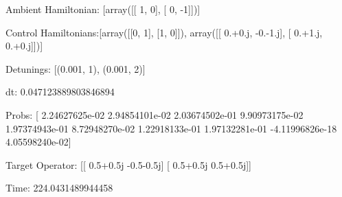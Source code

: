 \documentclass{article}
\begin{document}
    

\newpage

Ambient Hamiltonian: [array([[ 1,  0],
       [ 0, -1]])]

Control Hamiltonians:[array([[0, 1],
       [1, 0]]), array([[ 0.+0.j, -0.-1.j],
       [ 0.+1.j,  0.+0.j]])]

Detunings: [(0.001, 1), (0.001, 2)]

 dt: 0.047123889803846894

Probs: [  2.24627625e-02   2.94854101e-02   2.03674502e-01   9.90973175e-02
   1.97374943e-01   8.72948270e-02   1.22918133e-01   1.97132281e-01
  -4.11996826e-18   4.05598240e-02]

Target Operator: [[ 0.5+0.5j -0.5-0.5j]
 [ 0.5+0.5j  0.5+0.5j]]

Time: 224.0431489944458
\end{document}
